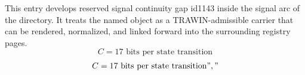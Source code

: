 
\begin{tzpsnapshot}
\end{tzpsnapshot}

This entry develops reserved signal continuity gap id1143 inside the signal arc of the directory. It treats the named object as a TRAWIN-admissible carrier that can be rendered, normalized, and linked forward into the surrounding registry pages.
\[
C = 17 \text{ bits per state transition}
\]
\[
C = 17 \text{ bits per state transition}","
\]

